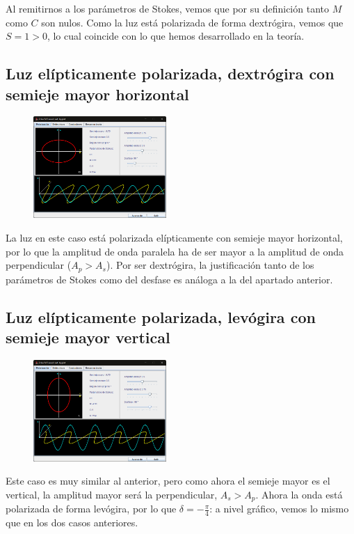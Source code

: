 \documentclass[11pt]{article}
\begin{document}
    \noindent Al remitirnos a los parámetros de Stokes, vemos que por su definición tanto $M$ como $C$ son nulos. Como la luz está polarizada de forma dextrógira, vemos que $S = 1 > 0$, lo cual coincide con lo que hemos desarrollado en la teoría.

    \subsection{Luz elípticamente polarizada, dextrógira con semieje mayor horizontal}
    \begin{figure}
        \vspace{-0.5cm}
        \centering
        \includegraphics[width=0.45\textwidth]{fotos/eliptica dext smh.png}
    \end{figure}
    \noindent La luz en este caso está polarizada elípticamente con semieje mayor horizontal, por lo que la amplitud de onda paralela ha de ser mayor a la amplitud de onda perpendicular ($A_p > A_s$). Por ser dextrógira, la justificación tanto de los parámetros de Stokes como del desfase es análoga a la del apartado anterior.\\
    \vspace{2.3cm}
    \subsection{Luz elípticamente polarizada, levógira con semieje mayor vertical}
    \begin{figure}
        \vspace{-0.5cm}
        \centering
        \includegraphics[width=0.45\textwidth]{fotos/eliptica lev smh.png}
    \end{figure}
    \noindent Este caso es muy similar al anterior, pero como ahora el semieje mayor es el vertical, la amplitud mayor será la perpendicular, $A_s > A_p$. Ahora la onda está polarizada de forma levógira, por lo que $\delta = -\frac{\pi}{4}$: a nivel gráfico, vemos lo mismo que en los dos casos anteriores. \\
\end{document}
